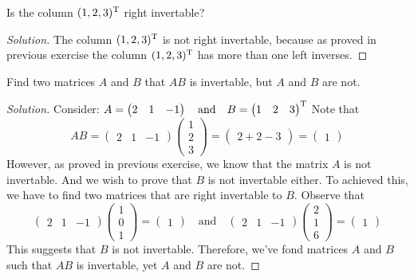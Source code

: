 \begin{exercise}
  Is the column $(1,2,3)^\mathrm{T}$ right invertable?
\end{exercise}
\begin{proof}[Solution]
  The column $(1,2,3)^\mathrm{T}$ is not right invertable, because
  as proved in previous exercise the column $(1,2,3)^\mathrm{T}$ has
  more than one left inverses.
\end{proof}
\begin{exercise}
  Find two matrices $A$ and $B$ that $AB$ is invertable, but
  $A$ and $B$ are not.
\end{exercise}
\begin{proof}[Solution]
  Consider:
  $ A=
    \begin{pmatrix}
      2&1&-1
    \end{pmatrix}
    \quad\text{and}\quad
    B=
    \begin{pmatrix}
      1&2&3
    \end{pmatrix}^\mathrm{T} $
    Note that
    \[
      AB=
    \begin{pmatrix}
      2&1&-1
    \end{pmatrix}
    \begin{pmatrix}
      1\\2\\3
    \end{pmatrix}=
    \begin{pmatrix}
      2+2-3
    \end{pmatrix}=
    \begin{pmatrix}
      1
    \end{pmatrix}
    \]
    However, as proved in previous exercise, we know that
    the matrix $A$ is not invertable. And we wish to prove that
    $B$ is not invertable either. To achieved this, we have to
    find two matrices that are right invertable to $B$. Observe that
    \[
      \begin{pmatrix}
        2&1&-1
      \end{pmatrix}
      \begin{pmatrix}
        1\\0\\1
      \end{pmatrix}=
      \begin{pmatrix}
        1
      \end{pmatrix}
      \quad\text{and}\quad
      \begin{pmatrix}
        2&1&-1
      \end{pmatrix}
      \begin{pmatrix}
        2\\1\\6
      \end{pmatrix}=
      \begin{pmatrix}
        1
      \end{pmatrix}
    \]
    This suggests that $B$ is not invertable. Therefore, we've fond
    matrices $A$ and $B$ such that $AB$ is invertable, yet 
    $A$ and $B$ are not.
\end{proof}
